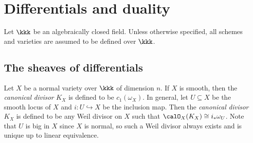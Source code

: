 \section{Differentials and duality}

Let \(\kkk\) be an algebraically closed field.
Unless otherwise specified, all schemes and varieties are assumed to be defined over \(\kkk\).

\subsection{The sheaves of differentials}

    \begin{definition}\label{def:canonical_divisor_on_normal_varieties}
        Let \(X\) be a normal variety over \(\kkk\) of dimension \(n\).
        If \(X\) is smooth, then the \emph{canonical divisor} \(K_X\) is defined to be \(c_1(\omega_X)\).
        In general, let \(U\subseteq X\) be the smooth locus of \(X\) and \(i:U\hookrightarrow X\) be the inclusion map.
        Then the \emph{canonical divisor} \(K_X\) is defined to be any Weil divisor on \(X\) such that \(\calO_X(K_X)\cong i_*\omega_U\).
        Note that \(U\) is big in \(X\) since \(X\) is normal, so such a Weil divisor always exists and is unique up to linear equivalence.
    \end{definition}

    
